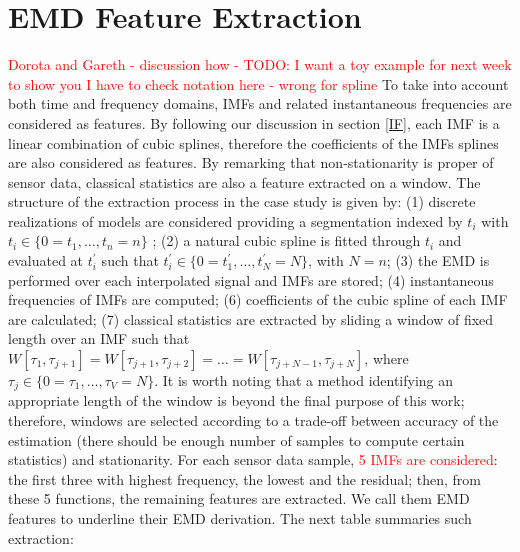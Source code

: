 \section{EMD Feature Extraction}
\label{sec:EMD_feat_extr}

\textcolor{red}{Dorota and Gareth - discussion how - TODO: I want a toy example for next week to show you}
\textcolor{red}{I have to check notation here - wrong for spline}
To take into account both time and frequency domains, IMFs and related instantaneous frequencies are considered as features. By following our discussion in section \ref{IF}, each IMF is a linear combination of cubic splines, therefore the coefficients of the IMFs splines are also considered as features. By remarking that non-stationarity is proper of sensor data, classical statistics are also a feature extracted  on a window. The structure of the extraction process in the case study is given by: (1) discrete realizations of models are considered providing a segmentation indexed by $t_i$ with $t_i \in \{ 0 =  t_1, \dots, t_n = n \}$ ; (2) a natural cubic spline is fitted through $t_i$ and evaluated at $t_i^{'}$ such that $t_i^{'} \in \{ 0 = t_1^{'}, \dots, t_N^{'} = N \}$, with $N=n$; (3) the EMD is performed over each interpolated signal and IMFs are stored; (4) instantaneous frequencies of IMFs are computed; (6) coefficients of the cubic spline of each IMF are calculated; (7) classical statistics are extracted by sliding a window of fixed length over an IMF such that $W \left[ \tau_1, \tau_{j+1} \right] = W \left[ \tau_{j+1}, \tau_{j+2} \right] = \dots = W \left[ \tau_{j+N-1}, \tau_{j+N} \right]$, where $\tau_j \in \{ 0 = \tau_1, \dots, \tau_V = N \}$. It is worth noting that a method identifying an appropriate length of the window is beyond the final purpose of this work; therefore, windows are selected according to a trade-off between accuracy of the estimation (there should  be enough number of samples to compute certain statistics) and stationarity. For each sensor data sample, \textcolor{red}{5 IMFs are considered}: the first three with highest frequency, the lowest and the residual; then, from these 5 functions, the remaining features are extracted. We call them EMD features to underline their EMD derivation. The next table summaries such extraction:

